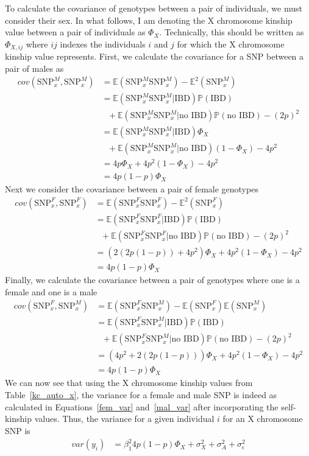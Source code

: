 \documentclass[11pt]{article} %
\newcommand{\snpXM}{\mbox{SNP}_x^M}
\newcommand{\snpXF}{\mbox{SNP}_x^F}
\begin{document}
To calculate the covariance of genotypes between a pair of individuals, we must consider their sex. In what follows, I am denoting the X chromosome kinship value between a pair of individuals as $\Phi_X$. Technically, this should be written as $\Phi_{X, ij}$ where $ij$ indexes the individuals $i$ and $j$ for which the X chromosome kinship value represents.
First, we calculate the covariance for a SNP between a pair of males as
\begin{align}
cov(\snpXM, \snpXM) &= \mathbb{E}(\snpXM \snpXM) - \mathbb{E}^2(\snpXM) \\
&=  \mathbb{E}(\snpXM \snpXM|\mbox{IBD})\mathbb{P}(\mbox{IBD}) \\
&\mbox{     }+\mathbb{E}(\snpXM \snpXM|\mbox{no IBD})\mathbb{P}(\mbox{no IBD})  -(2p)^2\\
&= \mathbb{E}(\snpXM \snpXM|\mbox{IBD})\Phi_X \\
&\mbox{     }  +\mathbb{E}(\snpXM \snpXM|\mbox{no IBD})(1-\Phi_X)-4p^2\\
&= 4p\Phi_X+4p^2(1-\Phi_X)-4p^2\\
&= 4p(1-p)\Phi_X
\end{align}
Next we consider the covariance between a pair of female genotypes
\begin{align}
cov(\snpXF,\snpXF) &= \mathbb{E}(\snpXF \snpXF) - \mathbb{E}^2(\snpXF) \\
&=  \mathbb{E}(\snpXF \snpXF|\mbox{IBD})\mathbb{P}(\mbox{IBD}) \\
&\mbox{     }+\mathbb{E}(\snpXF \snpXF|\mbox{no IBD})\mathbb{P}(\mbox{no IBD})  -(2p)^2\\
&= (2(2p(1-p))+4p^2)\Phi_X+4p^2(1-\Phi_X)-4p^2\\
&= 4p(1-p)\Phi_X
\end{align}
Finally, we calculate the covariance between a pair of genotypes where one is a female and one is a male
\begin{align}
cov(\snpXF,\snpXM) &= \mathbb{E}(\snpXF \snpXM) -\mathbb{E}(\snpXF)\mathbb{E}(\snpXM)\\
 &=  \mathbb{E}(\snpXF \snpXM|\mbox{IBD})\mathbb{P}(\mbox{IBD}) \\
&\mbox{     }+\mathbb{E}(\snpXF \snpXM|\mbox{no IBD})\mathbb{P}(\mbox{no IBD})  -(2p)^2\\
&= (4p^2+2(2p(1-p)))\Phi_X+4p^2(1-\Phi_X)-4p^2\\
&= 4p(1-p)\Phi_X
\end{align}
We can now see that using the X chromosome kinship values from Table~\ref{kc_auto_x}, the variance for a female and male SNP is indeed as calculated in Equations~\ref{fem_var} and~\ref{mal_var} after incorporating the self-kinship values. 
Thus, the variance for a given individual $i$ for an X chromosome SNP is 
\begin{align}
var(y_i)&=\beta_1^2 4p(1-p)\Phi_X+\sigma^2_X +\sigma^2_A + \sigma^2_\epsilon
\end{align}
\end{document}
